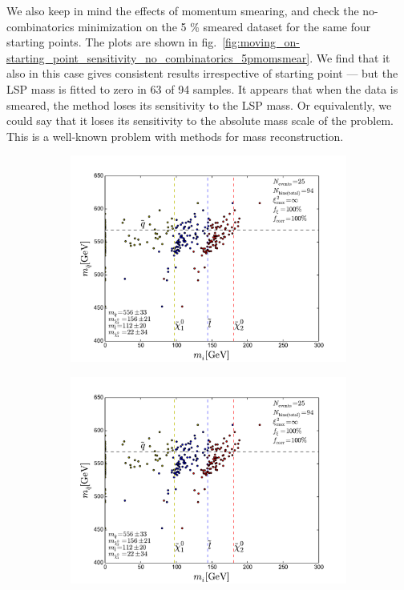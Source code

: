 \documentclass[twoside,english]{uiofysmaster}
\begin{document}
We also keep in mind the effects of momentum smearing, and check the no-combinatorics minimization on the 5 \% smeared dataset for the same four starting points. The plots are shown in fig.\ \ref{fig:moving_on-starting_point_sensitivity_no_combinatorics_5pmomsmear}. We find that it also in this case gives consistent results irrespective of starting point --- but the LSP mass is fitted to zero in 63 of 94 samples. It appears that when the data is smeared, the method loses its sensitivity to the LSP mass. Or equivalently, we could say that it loses its sensitivity to the absolute mass scale of the problem. This is a well-known problem with methods for mass reconstruction.
\begin{figure}[hbt]
	\centering
	\begin{subfigure}[b]{0.45\textwidth}
		\includegraphics[width=\textwidth]{figures/improving_combinatorics/herwigpp_5psmear_lowtol_nocomb_TMP.pdf} 
		\caption{ }
	\end{subfigure}
	\begin{subfigure}[b]{0.45\textwidth}
		\includegraphics[width=\textwidth]{figures/improving_combinatorics/herwigpp_5psmear_lowtol_nocomb_400-300-200-100.pdf}
		\caption{ } 
	\end{subfigure}


\end{figure}
\end{document}
